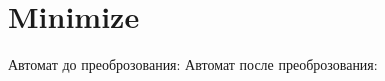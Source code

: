 \section{Minimize}
\begin{frame}{}
	Автомат до преоброзования:
	Автомат после преоброзования:
\end{frame}
